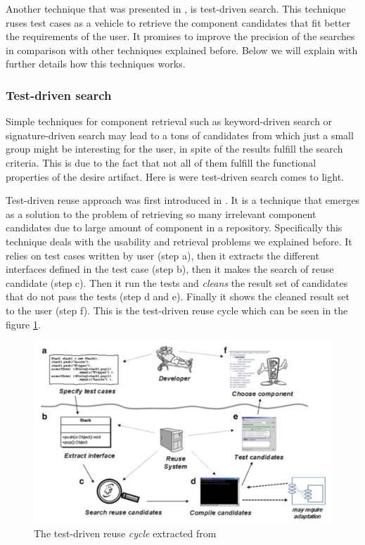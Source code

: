 Another technique that was presented in \cite{Hummel2004}, is test-driven search. This technique ruses test cases as a vehicle to retrieve the component candidates that fit better the requirements of the user. It promises to improve the precision of the searches in comparison with other techniques explained before. Below we will explain with further details how this techniques works. 

\subsubsection{Test-driven search}
Simple techniques for component retrieval such as keyword-driven search or signature-driven search may lead to a tons of candidates from which just a small group might be interesting for the user, in spite of the results fulfill the search criteria. This is due to the fact that not all of them fulfill the functional properties of the desire artifact. Here is were test-driven search comes to light. 

Test-driven reuse approach was first introduced in \cite{Hummel2004}. It is a technique that emerges as a solution to the problem of retrieving so many irrelevant component candidates due to large amount of component in a repository. Specifically this technique deals with the usability and retrieval problems we explained before. It relies on test cases written by user (step a), then it extracts the different interfaces defined in the test case (step b), then it makes the search of reuse candidate (step c). Then it run the tests and \textit{cleans} the result set of candidates that do not pass the tests (step d and e). Finally it shows the cleaned result set to the user (step f). This is the test-driven reuse cycle which can be seen in the figure \ref{fig:test-driven-cycle}.

\begin{figure}[ht]
	\centering
    \includegraphics[width=\textwidth]{grafiken/test-driven-cycle}
    \caption{The test-driven reuse \textit{cycle} extracted from \cite{Hummel2013}}
    \label{fig:test-driven-cycle}
\end{figure}

